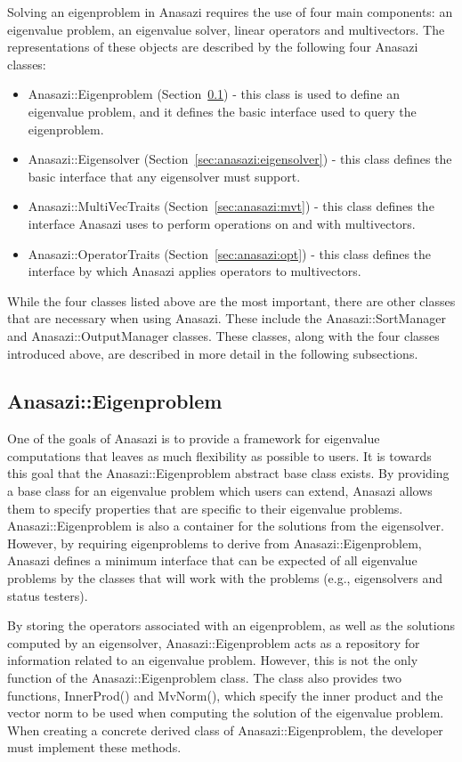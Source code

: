 Solving an eigenproblem in Anasazi requires the use of four main components: an
eigenvalue problem, an eigenvalue solver, linear operators and multivectors.
The representations of these objects are described by the following four Anasazi
classes:
\begin{itemize}
\item Anasazi::Eigenproblem (Section~\ref{sec:anasazi:eigenproblem}) -
this class is used to define an eigenvalue problem, and it
defines the basic interface used to query the eigenproblem.
\item Anasazi::Eigensolver (Section~\ref{sec:anasazi:eigensolver}) - this class defines the basic interface that any
eigensolver must support.
\item Anasazi::MultiVecTraits (Section~\ref{sec:anasazi:mvt}) - this class defines the interface Anasazi uses to 
perform operations on and with multivectors.
\item Anasazi::OperatorTraits (Section~\ref{sec:anasazi:opt}) - this class defines the interface by which Anasazi
applies operators to multivectors.
\end{itemize}

While the four classes listed above are the most important, there are other
classes that are necessary when using Anasazi. These include the
Anasazi::SortManager and Anasazi::OutputManager classes. These classes, along
with the four classes introduced above, are described in more detail in the
following subsections.

\subsection{Anasazi::Eigenproblem}
\label{sec:anasazi:eigenproblem}

One of the goals of Anasazi is to provide a framework for eigenvalue
computations that leaves as much flexibility as possible to users. It is towards
this goal that the Anasazi::Eigenproblem abstract base class exists. By
providing a base class for an eigenvalue problem which users can extend, Anasazi
allows them to specify properties that are specific to their eigenvalue
problems. Anasazi::Eigenproblem is also a container for the solutions
from the eigensolver. However, by requiring eigenproblems to derive from
Anasazi::Eigenproblem, Anasazi defines a minimum interface that can be
expected of all eigenvalue problems by the classes that will work with the
problems (e.g., eigensolvers and status testers).

By storing the operators associated with an eigenproblem, as well as the
solutions computed by an eigensolver, Anasazi::Eigenproblem acts as a
repository for information related to an eigenvalue problem. However, this is
not the only function of the Anasazi::Eigenproblem class. The class also
provides two functions, InnerProd() and MvNorm(), which specify
the inner product and the vector norm to be used when computing the solution of
the eigenvalue problem. When creating a concrete derived class of
Anasazi::Eigenproblem, the developer must implement these methods.

